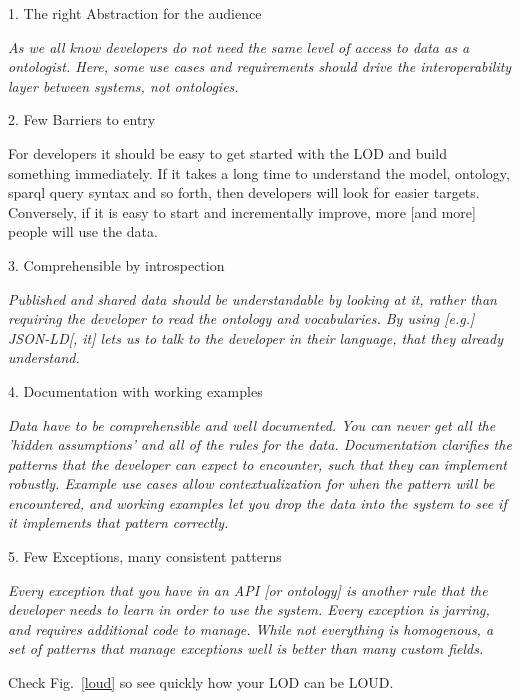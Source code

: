 \documentclass[twocolumn]{autart}
\begin{document}
1. The right Abstraction for the audience

\textit{As we all know \frqq developers do not need the same level of access to data as a ontologist. Here, some use cases and requirements should drive the interoperability layer between systems, not ontologies. \flqq}

2. Few Barriers to entry

For developers it should \frqq be easy to get started with the LOD and build something \flqq immediately. \frqq If it takes a long time to understand the model, ontology, sparql query syntax and so forth, then developers will look for easier targets. Conversely, if it is easy to start and incrementally improve, more [and more] people will use the data. \flqq

3. Comprehensible by introspection

\textit{Published and shared \frqq data should be understandable by looking at it, rather than requiring the developer to read the ontology and vocabularies. \flqq By \frqq using [e.g.] JSON-LD[, it] lets us to talk to the developer in their language, that they already understand. \flqq}

4. Documentation with working examples

\textit{Data have to be comprehensible and well documented. \frqq You can never \flqq get all the 'hidden assumptions' and \frqq all of the rules for the data. Documentation clarifies the patterns that the developer can expect to encounter, such that they can implement robustly. Example use cases allow contextualization for when the pattern will be encountered, and working examples let you drop the data into the system to see if it implements that pattern correctly. \flqq}

5. Few Exceptions, many consistent patterns

\textit{\frqq Every exception that you have in an API [or ontology] is another rule that the developer needs to learn in order to use the system. Every exception is jarring, and requires additional code to manage. While not everything is homogenous, a set of patterns that manage exceptions well is better than many custom fields. \flqq}

Check Fig.~\ref{loud} so see quickly how your LOD can be LOUD.
\end{document}
